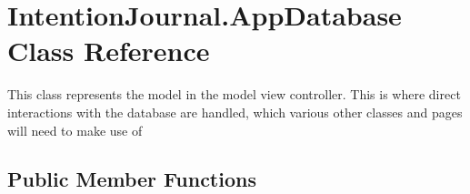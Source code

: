 \hypertarget{class_intention_journal_1_1_app_database}{}\section{Intention\+Journal.\+App\+Database Class Reference}
\label{class_intention_journal_1_1_app_database}


This class represents the model in the model view controller. This is where direct interactions with the database are handled, which various other classes and pages will need to make use of  


\subsection*{Public Member Functions}
